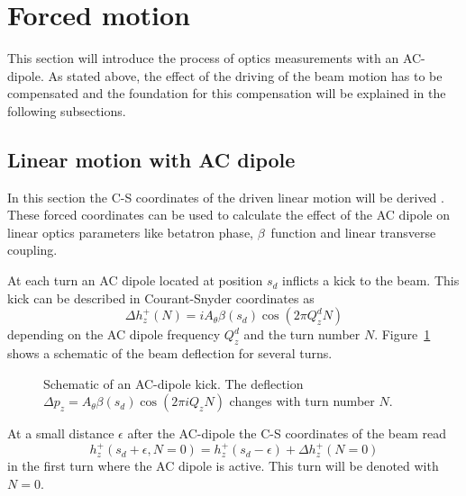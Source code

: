 \section{Forced motion}

This section will introduce the process of optics measurements with an AC-dipole. As stated above,
the effect of the driving of the beam motion has to be compensated and the foundation for this
compensation will be explained in the following subsections.

\subsection{Linear motion with AC dipole}
\newcommand{\Qd}[1]{Q^{d}_{#1}}
\label{sec_driven_coords}

In this section the C-S coordinates of the driven linear motion will be derived \cite{Miyamoto2010,Peggs1998}. These forced coordinates
can be used to calculate the effect of the AC dipole on linear optics parameters like betatron phase, 
$\beta$~function and linear transverse coupling.

At each turn an AC dipole located at position $s_d$ inflicts a kick to the beam. This kick can be
described in Courant-Snyder coordinates as
%
\begin{equation}
    \Delta h_z^+(N) = i A_\theta\beta(s_d) \cos(2\pi \Qd{z} N)
    \label{eq_ackick}
\end{equation}
%
depending on the AC dipole frequency $\Qd{z}$ and the turn number $N$. Figure~\ref{fig_ac_kick} shows
a schematic of the beam deflection for several turns.
%
\begin{figure}[ht]
    \centering
    
    \caption{
        Schematic of an AC-dipole kick. The deflection $\Delta p_z = A_\theta\beta(s_d)\cos(2\pi i Q_z N)$
        changes with turn number $N$.}
    \label{fig_ac_kick}
\end{figure}
%
At a small distance $\epsilon$ after the AC-dipole the C-S coordinates of the beam read
%
\begin{equation}
    h_z^+(s_d + \epsilon, N=0) = h_z^+(s_d-\epsilon) + \Delta h_z^+(N=0)
    \label{eq_ackick_at_epsilon}
\end{equation}
%
in the first turn where the AC dipole is active. This turn will be denoted with $N=0$.

